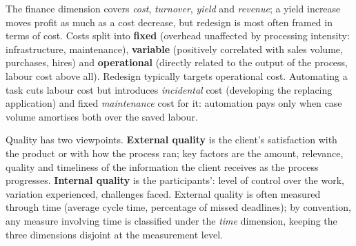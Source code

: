 The finance dimension covers \emph{cost}, \emph{turnover}, \emph{yield} and \emph{revenue}; a yield increase moves profit as much as a cost decrease, but redesign is most often framed in terms of cost. Costs split into \textbf{fixed} (overhead unaffected by processing intensity: infrastructure, maintenance), \textbf{variable} (positively correlated with sales volume, purchases, hires) and \textbf{operational} (directly related to the output of the process, labour cost above all). Redesign typically targets operational cost. Automating a task cuts labour cost but introduces \emph{incidental} cost (developing the replacing application) and fixed \emph{maintenance} cost for it: automation pays only when case volume amortises both over the saved labour.

Quality has two viewpoints. \textbf{External quality} is the client's satisfaction with the product or with how the process ran; key factors are the amount, relevance, quality and timeliness of the information the client receives as the process progresses. \textbf{Internal quality} is the participants': level of control over the work, variation experienced, challenges faced. External quality is often measured through time (average cycle time, percentage of missed deadlines); by convention, any measure involving time is classified under the \emph{time} dimension, keeping the three dimensions disjoint at the measurement level.

